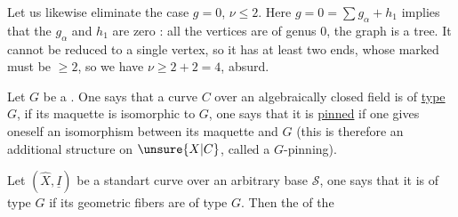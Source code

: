 Let us likewise eliminate the case $g=0$, $\nu\leq2$. Here $g=0=\sum g_\alpha+h_1$ implies that the $g_\alpha$ and $h_1$ are zero : all the vertices are of genus $0$, the graph is a tree. It cannot be reduced to a single vertex, so it has at least two ends, whose marked  must be $\geq2$, so  we have $\nu\geq2+2=4$, absurd.

Let $G$ be a . One says that a   curve $C$ over an algebraically closed field is of \uline{type $G$}, if its maquette is isomorphic to $G$, one says that it is \uline{pinned} if one gives oneself an isomorphism between its maquette and $G$ (this is therefore an additional structure on $\unsure{X|C}$, called a $G$-pinning).

Let $(\widehat X,\underline I)$ be a standart curve over an arbitrary base $\mathcal S$, one says that it is of type $G$ if its geometric fibers are of type $G$. Then the  of the

